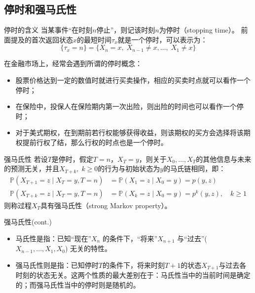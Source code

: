 \documentclass[t]{beamer}
\renewcommand{\Pr}{\mathbb{P}}
\begin{document}
\subsection{停时和强马氏性}
\begin{frame}{停时的含义}
    当某事件“在时刻$n$停止”，则记该时刻$n$为停时（stopping time）。
    前面提及的首次返回状态$x$的最短时间$\tau_x$就是一个停时，可以表示为：
    \[\{\tau_x=n \}=\{X_n=x,\; X_{n-1}\ne x,\ldots,\; X_1\ne x \} \]	

    在金融市场上，经常会遇到所谓的停时概念：
    \begin{itemize}
        \item 股票价格达到一定的数值时就进行买卖操作，相应的买卖时点就可以看作一个停时；
     \item   在保险中，投保人在保险期内第一次出险，则出险的时间也可以看作一个停时；
     \item   对于美式期权，在到期前若行权能够获得收益，则该期权的买方会选择将该期权提前行权了结，那么行权的时点也是一个停时。
    \end{itemize}
    
\end{frame}


\begin{frame}{强马氏性}
    若设$T$是停时，假定$T=n$，$X_T=y$，则关于$X_0,\ldots,X_T$的其他信息与未来的预测无关，并且$X_{T+k},\; k\ge0$的行为与初始状态为$y$的马氏链相同，即：
    \[\begin{split}
    \Pr(X_{T+1}=z\;|\;X_T=y,T=n)&=\Pr(X_1=z\;|\;X_0=y)=p(y,z)\\
    \Pr(X_{T+k}=z\;|\;X_T=y,T=n)&=\Pr(X_k=z\;|\;X_0=y)=p^k(y,z),\quad k\ge 1 
    \end{split}
    \]	
    则称过程$X_T$具有强马氏性（strong Markov property）。
\end{frame}

\begin{frame}{强马氏性(cont.)}
    \begin{itemize}
        \item 马氏性是指：已知“现在”$X_n$ 的条件下，“将来”$X_{n+1}$ 与“过去”($X_{n-1},\ldots,X_1,X_0$) 无关的特性。
        \item 强马氏性则是指：已知停时$T$的条件下，将来时刻$T+1$的状态$X_{T+1}$与过去各时刻的状态无关。这两个性质的最大差别在于：马氏性当中的当前时间是确定的；而强马氏性当中的停时则是随机的。
    \end{itemize}
    

    \begin{center}
    \end{center}
\end{frame}
\end{document}
